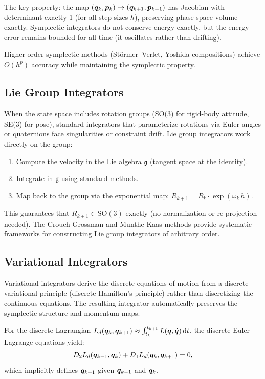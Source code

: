 The key property: the map $(\bm{q}_k, \bm{p}_k) \mapsto (\bm{q}_{k+1}, \bm{p}_{k+1})$ has
Jacobian with determinant exactly 1 (for all step sizes $h$), preserving phase-space
volume exactly. Symplectic integrators do not conserve energy exactly, but the energy
error remains bounded for all time (it oscillates rather than drifting).

Higher-order symplectic methods (Störmer--Verlet, Yoshida compositions) achieve $O(h^p)$
accuracy while maintaining the symplectic property.

\subsection{Lie Group Integrators}

When the state space includes rotation groups (SO(3) for rigid-body attitude, SE(3) for
pose), standard integrators that parameterize rotations via Euler angles or quaternions
face singularities or constraint drift. Lie group integrators work directly on the group:

\begin{enumerate}
\item Compute the velocity in the Lie algebra $\mathfrak{g}$ (tangent space at the identity).
\item Integrate in $\mathfrak{g}$ using standard methods.
\item Map back to the group via the exponential map: $R_{k+1} = R_k \cdot \exp(\omega_k \, h)$.
\end{enumerate}

This guarantees that $R_{k+1} \in \text{SO}(3)$ exactly (no normalization or re-projection
needed). The Crouch-Grossman and Munthe-Kaas methods provide systematic frameworks for
constructing Lie group integrators of arbitrary order.

\subsection{Variational Integrators}

Variational integrators derive the discrete equations of motion from a discrete
variational principle (discrete Hamilton's principle) rather than discretizing the
continuous equations. The resulting integrator automatically preserves the symplectic
structure and momentum maps.

For the discrete Lagrangian $L_d(\bm{q}_k, \bm{q}_{k+1}) \approx \int_{t_k}^{t_{k+1}} L(\bm{q}, \dot{\bm{q}}) \, \mathrm{d} t$,
the discrete Euler-Lagrange equations yield:
\begin{equation}
D_2 L_d(\bm{q}_{k-1}, \bm{q}_k) + D_1 L_d(\bm{q}_k, \bm{q}_{k+1}) = 0,
\label{eq:ch2:discrete-euler-lagrange}
\end{equation}
which implicitly defines $\bm{q}_{k+1}$ given $\bm{q}_{k-1}$ and $\bm{q}_k$.

